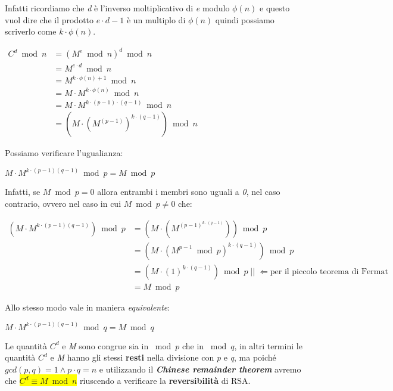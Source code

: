 Infatti ricordiamo che \textit{d} è l'inverso moltiplicativo di \textit{e} modulo $\phi(n)$ e questo vuol dire che il prodotto $e \cdot d - 1$ è un multiplo di $\phi(n)$ quindi possiamo scriverlo come $k \cdot \phi(n)$.
\begin{center}
    \begin{math}
        \begin{aligned}
            C^d \bmod n &= (M^e \bmod n)^d \bmod n \\
            &= M^{e \cdot d} \bmod n \\
            &= M^{k \cdot \phi(n) + 1} \bmod n \\
            &= M \cdot M^{k \cdot \phi(n)} \bmod n \\
            &= M \cdot M^{k \cdot (p - 1) \cdot (q - 1)} \bmod n \\
            &= (M \cdot (M^{(p-1)})^{k \cdot (q - 1)}) \bmod n 
        \end{aligned}
    \end{math}
\end{center}
Possiamo verificare l'ugualianza:
\begin{center}
    $M \cdot M^{k \cdot (p - 1)(q - 1)} \bmod p = M \bmod p$
\end{center}
Infatti, se $M \bmod p = 0$ allora entrambi i membri sono uguali a \textit{0}, nel caso contrario, ovvero nel caso in cui $M \bmod p \neq 0$ che:
\begin{center}
    \begin{math}
        \begin{aligned}
            (M \cdot M^{k \cdot (p - 1)(q - 1)}) \bmod p &= (M \cdot (M^{(p - 1)^{k \cdot (q - 1)}})) \bmod p \\
            &= (M \cdot (M^{p - 1} \bmod p)^{k \cdot (q - 1)}) \bmod p \\
            &= (M \cdot (1)^{k \cdot (q - 1)}) \bmod p\;||\;\Leftarrow \text{per il piccolo teorema di Fermat} \\
            &= M \bmod p
        \end{aligned}
    \end{math}
\end{center}
Allo stesso modo vale in maniera \textit{equivalente}:
\begin{center}
    $M \cdot M^{k \cdot (p - 1)(q - 1)} \bmod q = M \bmod q$
\end{center}
Le quantità $C^d$ e \textit{M} sono congrue sia in $\bmod p$ che in $\bmod q$, in altri termini le quantità $C^d$ e \textit{M} hanno gli stessi \textbf{resti} nella divisione con \textit{p} e \textit{q}, ma poiché $gcd(p, q) = 1 \land p \cdot q = n$ e utilizzando il \textbf{\textit{Chinese remainder theorem}} avremo che \colorbox{yellow}{$C^d \equiv M \bmod n$} riuscendo a verificare la \textbf{reversibilità} di RSA.
